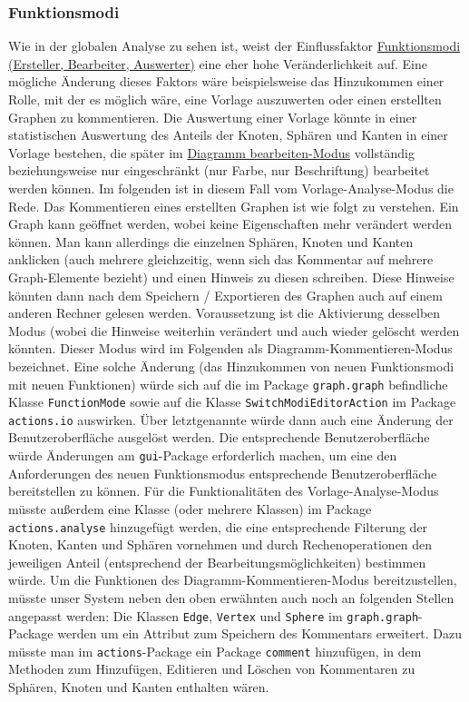 \documentclass[enabledeprecatedfontcommands,fontsize=11pt,paper=a4,twoside]{scrartcl}
\newcounter{one}
\begin{document}
	\subsubsection{Funktionsmodi}
	Wie in der globalen Analyse zu sehen ist, weist der Einflussfaktor \hyperlink{z}{Funktionsmodi (Ersteller, Bearbeiter, Auswerter)} eine eher hohe Veränderlichkeit auf. Eine mögliche Änderung dieses Faktors wäre beispielsweise das Hinzukommen einer Rolle, mit der es möglich wäre, eine Vorlage auszuwerten oder einen erstellten Graphen zu kommentieren.
	Die Auswertung einer Vorlage könnte in einer statistischen Auswertung des Anteils der Knoten, Sphären und Kanten in einer Vorlage bestehen, die später im \hyperlink{``Diagramm bearbeiten''-Modus}{\glqq Diagramm bearbeiten\grqq-Modus} vollständig beziehungsweise nur eingeschränkt (nur Farbe, nur Beschriftung) bearbeitet werden können. Im folgenden ist in diesem Fall vom Vorlage-Analyse-Modus die Rede.
	Das Kommentieren eines erstellten Graphen ist wie folgt zu verstehen. Ein Graph kann geöffnet werden, wobei keine Eigenschaften mehr verändert werden können. Man kann allerdings die einzelnen Sphären, Knoten und Kanten anklicken (auch mehrere gleichzeitig, wenn sich das Kommentar auf mehrere Graph-Elemente bezieht) und einen Hinweis zu diesen schreiben. Diese Hinweise könnten dann nach dem Speichern / Exportieren des Graphen auch auf einem anderen Rechner gelesen werden. Voraussetzung ist die Aktivierung desselben Modus (wobei die Hinweise weiterhin verändert und auch wieder gelöscht werden könnten. Dieser Modus wird im Folgenden als Diagramm-Kommentieren-Modus bezeichnet.
	Eine solche Änderung (das Hinzukommen von neuen Funktionsmodi mit neuen Funktionen) würde sich auf die im Package \texttt{graph.graph} befindliche Klasse \texttt{FunctionMode} sowie auf die Klasse \texttt{SwitchModiEditorAction} im Package \texttt{actions.io} auswirken. Über letztgenannte würde dann auch eine Änderung der Benutzeroberfläche ausgelöst werden. Die entsprechende Benutzeroberfläche würde Änderungen am \texttt{gui}-Package erforderlich machen, um eine den Anforderungen des neuen Funktionsmodus entsprechende Benutzeroberfläche bereitstellen zu können.
	Für die Funktionalitäten des Vorlage-Analyse-Modus müsste außerdem eine Klasse (oder mehrere Klassen) im Package \texttt{actions.analyse} hinzugefügt werden, die eine entsprechende Filterung der Knoten, Kanten und Sphären vornehmen und durch Rechenoperationen den jeweiligen Anteil (entsprechend der Bearbeitungsmöglichkeiten) bestimmen würde.
	Um die Funktionen des Diagramm-Kommentieren-Modus bereitzustellen, müsste unser System neben den oben erwähnten auch noch an folgenden Stellen angepasst werden: Die Klassen \texttt{Edge}, \texttt{Vertex} und \texttt{Sphere} im \texttt{graph.graph}-Package werden um ein Attribut zum Speichern des Kommentars erweitert. Dazu müsste man im \texttt{actions}-Package ein Package \texttt{comment} hinzufügen, in dem Methoden zum Hinzufügen, Editieren und Löschen von Kommentaren zu Sphären, Knoten und Kanten enthalten wären. \\
	
\end{document}
